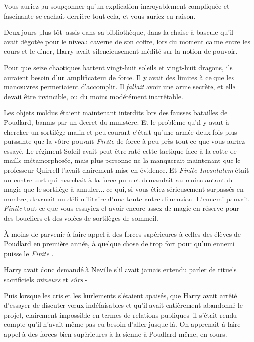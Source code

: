 Vous auriez pu soupçonner qu'un explication incroyablement compliquée et fascinante se cachait derrière tout cela, et vous auriez eu raison.

Deux jours plus tôt, assis dans sa bibliothèque, dans la chaise à bascule qu'il avait dégotée pour le niveau caverne de son coffre, lors du moment calme entre les cours et le dîner, Harry avait silencieusement médité sur la notion de pouvoir.

Pour que seize chaotiques battent vingt-huit soleils et vingt-huit dragons, ils auraient besoin d'un amplificateur de force. Il y avait des limites à ce que les manœuvres permettaient d'accomplir. Il \emph{fallait}  avoir une arme secrète, et elle devait être invincible, ou du moins modérément inarrêtable.

Les objets moldus étaient maintenant interdits lors des fausses batailles de Poudlard, bannis par un décret du ministère. Et le problème qu'il y avait à chercher un sortilège malin et peu courant c'était qu'une armée deux fois plus puissante que la vôtre pouvait \emph{Finite}  de force à peu près tout ce que vous auriez essayé. Le régiment Soleil avait peut-être raté cette tactique face à la cotte de maille métamorphosée, mais plus personne ne la manquerait maintenant que le professeur Quirrell l'avait clairement mise en évidence. Et \emph{Finite Incantatem}  était un contre-sort qui marchait à la force pure et demandait au moins autant de magie que le sortilège à annuler... ce qui, si vous étiez sérieusement surpassés en nombre, devenait un défi militaire d'une toute autre dimension. L'ennemi pouvait \emph{Finite}  tout ce que vous essayiez et avoir encore assez de magie en réserve pour des boucliers et des volées de sortilèges de sommeil.

À moins de parvenir à faire appel à des forces supérieures à celles des élèves de Poudlard en première année, à quelque chose de trop fort pour qu'un ennemi puisse le \emph{Finite} .

Harry avait donc demandé à Neville s'il avait jamais entendu parler de rituels sacrificiels \emph{mineurs } et \emph{sûrs}  -

Puis lorsque les cris et les hurlements s'étaient apaisés, que Harry avait arrêté d'essayer de discuter vœux indéfaisables et qu'il avait entièrement abandonné le projet, clairement impossible en termes de relations publiques, il s'était rendu compte qu'il n'avait même pas eu besoin d'aller jusque là. On apprenait à faire appel à des forces bien supérieures à la sienne à Poudlard même, en cours.


